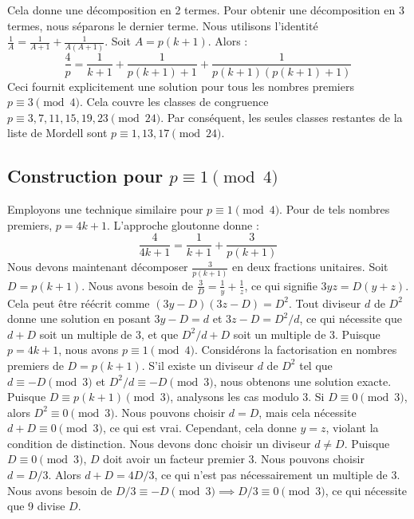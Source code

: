 \documentclass[11pt,a4paper]{article}
\begin{document}
Cela donne une d\'ecomposition en 2 termes. Pour obtenir une d\'ecomposition en 3 termes, nous s\'eparons le dernier terme. Nous utilisons l'identit\'e $\frac{1}{A} = \frac{1}{A+1} + \frac{1}{A(A+1)}$. Soit $A = p(k+1)$. Alors :
\begin{equation}
\frac{4}{p} = \frac{1}{k+1} + \frac{1}{p(k+1)+1} + \frac{1}{p(k+1)(p(k+1)+1)}
\end{equation}
Ceci fournit explicitement une solution pour tous les nombres premiers $p \equiv 3 \pmod{4}$. Cela couvre les classes de congruence $p \equiv 3, 7, 11, 15, 19, 23 \pmod{24}$. Par cons\'equent, les seules classes restantes de la liste de Mordell sont $p \equiv 1, 13, 17 \pmod{24}$.

\subsection{Construction pour $p \equiv 1 \pmod{4}$}
Employons une technique similaire pour $p \equiv 1 \pmod{4}$. Pour de tels nombres premiers, $p = 4k+1$.
L'approche gloutonne donne :
\begin{equation}
\frac{4}{4k+1} = \frac{1}{k+1} + \frac{3}{p(k+1)}
\end{equation}
Nous devons maintenant d\'ecomposer $\frac{3}{p(k+1)}$ en deux fractions unitaires. Soit $D = p(k+1)$. Nous avons besoin de $\frac{3}{D} = \frac{1}{y} + \frac{1}{z}$, ce qui signifie $3yz = D(y+z)$. Cela peut \^etre r\'e\'ecrit comme $(3y - D)(3z - D) = D^2$.
Tout diviseur $d$ de $D^2$ donne une solution en posant $3y - D = d$ et $3z - D = D^2/d$, ce qui n\'ecessite que $d+D$ soit un multiple de 3, et que $D^2/d + D$ soit un multiple de 3.
Puisque $p = 4k+1$, nous avons $p \equiv 1 \pmod{4}$.
Consid\'erons la factorisation en nombres premiers de $D = p(k+1)$. S'il existe un diviseur $d$ de $D^2$ tel que $d \equiv -D \pmod{3}$ et $D^2/d \equiv -D \pmod{3}$, nous obtenons une solution exacte.
Puisque $D \equiv p(k+1) \pmod{3}$, analysons les cas modulo 3.
Si $D \equiv 0 \pmod{3}$, alors $D^2 \equiv 0 \pmod{3}$. Nous pouvons choisir $d=D$, mais cela n\'ecessite $d+D \equiv 0 \pmod{3}$, ce qui est vrai. Cependant, cela donne $y=z$, violant la condition de distinction. Nous devons donc choisir un diviseur $d \neq D$. Puisque $D \equiv 0 \pmod{3}$, $D$ doit avoir un facteur premier 3. Nous pouvons choisir $d = D/3$. Alors $d + D = 4D/3$, ce qui n'est pas n\'ecessairement un multiple de 3. Nous avons besoin de $D/3 \equiv -D \pmod{3} \implies D/3 \equiv 0 \pmod{3}$, ce qui n\'ecessite que 9 divise $D$.
\end{document}
